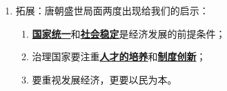\documentclass[12pt, a4paper, oneside]{ctexart}
\begin{document}
\begin{enumerate}
\begin{enumerate}
					\end{enumerate}
				\item 拓展：唐朝盛世局面两度出现给我们的启示：
					\begin{enumerate}
						\item \underline{\textbf{国家统一}}和\underline{\textbf{社会稳定}}是经济发展的前提条件；
						\item 治理国家要注重\underline{\textbf{人才的培养}}和\underline{\textbf{制度创新}}；
						\item 要重视发展经济，更要以民为本。
					\end{enumerate}
		\end{enumerate}
\end{document}
